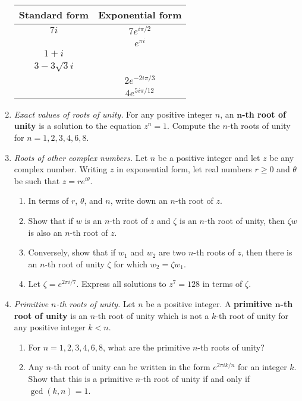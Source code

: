 \begin{enumerate}
\begin{center}
\begingroup
\setlength{\tabcolsep}{10pt}
\renewcommand{\arraystretch}{1.5}
\begin{tabular}{|c|c|} \hline
Standard form & Exponential form \\ \hline
$7i$ & $7e^{i\pi/2}$ \\ \hline
{} & $e^{\pi i}$ \\ \hline
$1 + i$ & {} \\ \hline
$3 - 3\sqrt{3}i$ & {} \\ \hline
{} & $2e^{-2i\pi/3}$ \\ \hline
{} & $4e^{5i\pi/12}$ \\ \hline
\end{tabular}
\endgroup
\end{center}
\item \emph{Exact values of roots of unity.} For any positive integer $n$, an $\boldsymbol n$\textbf{-th root of unity} is a solution to the equation $z^n = 1$. Compute the $n$-th roots of unity for $n = 1, 2, 3, 4, 6, 8$.
\item \emph{Roots of other complex numbers.} Let $n$ be a positive integer and let $z$ be any complex number. Writing $z$ in exponential form, let real numbers $r\geq 0$ and $\theta$ be such that $z = re^{i\theta}$.
\begin{enumerate}
\item In terms of $r$, $\theta$, and $n$, write down an $n$-th root of $z$.
\item Show that if $w$ is an $n$-th root of $z$ and $\zeta$ is an $n$-th root of unity, then $\zeta w$ is also an $n$-th root of $z$.
\item Conversely, show that if $w_1$ and $w_2$ are two $n$-th roots of $z$, then there is an $n$-th root of unity $\zeta$ for which $w_2 = \zeta w_1$.
\item Let $\zeta = e^{2\pi i/7}$. Express all solutions to $z^7 = 128$ in terms of $\zeta$.
\end{enumerate}
\item \emph{Primitive $n$-th roots of unity.} Let $n$ be a positive integer. A \textbf{primitive $\boldsymbol n$-th root of unity} is an $n$-th root of unity which is not a $k$-th root of unity for any positive integer $k < n$.
\begin{enumerate}
\item For $n = 1, 2, 3, 4, 6, 8$, what are the primitive $n$-th roots of unity?
\item Any $n$-th root of unity can be written in the form $e^{2\pi ik/n}$ for an integer $k$. Show that this is a primitive $n$-th root of unity if and only if $\gcd(k,n) = 1$.

\end{enumerate}
\end{enumerate}
